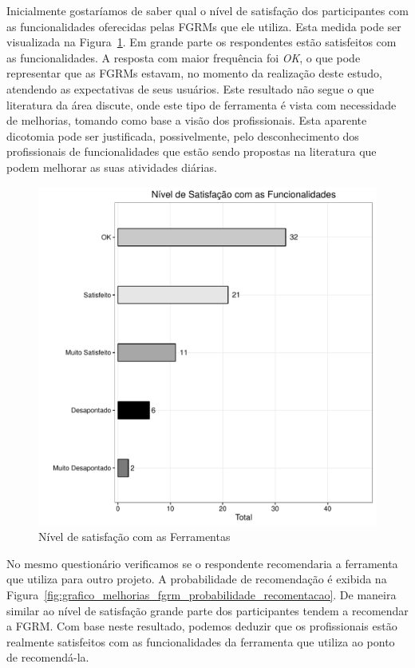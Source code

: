 Inicialmente gostaríamos de saber qual o nível de satisfação dos participantes
com as funcionalidades oferecidas pelas FGRMs que ele utiliza. Esta medida pode
ser visualizada na Figura~\ref{fig:grafico_melhorias_fgrm_nivel_satisfacao}. Em
grande parte os respondentes estão satisfeitos com as funcionalidades. A
resposta com maior frequência foi \textit{OK}, o que pode representar que as
FGRMs estavam, no momento da realização deste estudo, atendendo as expectativas
de seus usuários. Este resultado não segue o que literatura da área discute,
onde este tipo de ferramenta é vista com necessidade de melhorias, tomando como
base a visão dos profissionais. Esta aparente dicotomia pode ser justificada,
possivelmente, pelo desconhecimento dos profissionais de funcionalidades que
estão sendo propostas na literatura que podem melhorar as suas atividades
diárias.

\begin{figure}[htpb] \centering
    \includegraphics[width=0.5\linewidth]{./chapter-pesquisa-com-profissionais/img/grafico_melhorias_fgrm_nivel_satisfacao.pdf}
    \caption{Nível de satisfação com as Ferramentas}
\label{fig:grafico_melhorias_fgrm_nivel_satisfacao}
\end{figure}

No mesmo questionário verificamos se o respondente recomendaria a ferramenta que
utiliza para outro projeto. A probabilidade de recomendação é exibida na
Figura~\ref{fig:grafico_melhorias_fgrm_probabilidade_recomentacao}. De maneira
similar ao nível de satisfação grande parte dos participantes tendem a
recomendar a FGRM\@. Com base neste resultado, podemos deduzir que os
profissionais estão realmente satisfeitos com as funcionalidades da ferramenta
que utiliza ao ponto de recomendá-la.

